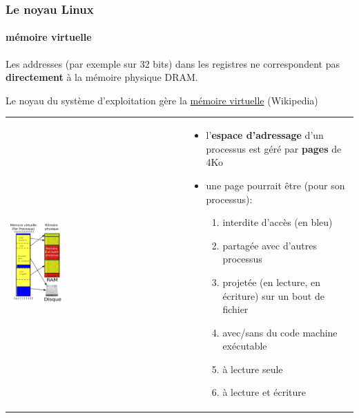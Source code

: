 \documentclass[xcolor=svgnames,final,smaller,a4]{beamer}
\begin{document}
\begin{frame}
  \frametitle{Le noyau Linux}
  \framesubtitle{mémoire virtuelle}

  Les addresses (par exemple sur 32 bits) dans les registres ne correspondent pas \textbf{directement} à la mémoire physique DRAM.

  Le noyau du système d'exploitation gère la \href{https://fr.wikipedia.org/wiki/Mémoire_virtuelle}{mémoire virtuelle} (Wikipedia)

  \begin{tabular}{l|p{8.5cm}}
    \includegraphics[width=0.30\textwidth]{Memoire-virtuelle} & %
    \begin{minipage}[b]{7cm}
      \begin{itemize}
      \item l'\textbf{espace d'adressage} d'un processus est géré par \textbf{pages} de 4Ko
      \item une page pourrait être (pour son processus): \begin{enumerate}
      \item interdite d'accès (en bleu)
      \item partagée avec d'autres processus
      \item projetée (en lecture, en écriture) sur un bout de fichier
      \item avec/sans du code machine exécutable 
      \item à lecture seule
      \item à lecture et écriture
      \end{enumerate}
      \end{itemize}
    \end{minipage}
  \end{tabular}
\end{frame}
\end{document}
